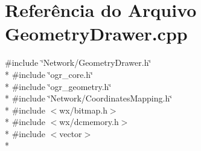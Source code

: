 \section{Referência do Arquivo Geometry\+Drawer.\+cpp}
\label{_geometry_drawer_8cpp}
{\ttfamily \#include \char`\"{}Network/\+Geometry\+Drawer.\+h\char`\"{}}\\*
{\ttfamily \#include \char`\"{}ogr\+\_\+core.\+h\char`\"{}}\\*
{\ttfamily \#include \char`\"{}ogr\+\_\+geometry.\+h\char`\"{}}\\*
{\ttfamily \#include \char`\"{}Network/\+Coordinates\+Mapping.\+h\char`\"{}}\\*
{\ttfamily \#include $<$wx/bitmap.\+h$>$}\\*
{\ttfamily \#include $<$wx/dcmemory.\+h$>$}\\*
{\ttfamily \#include $<$vector$>$}\\*
